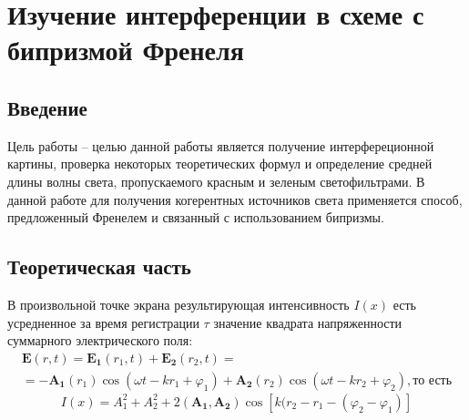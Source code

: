 
\usepackage{setspace}
\usepackage{colortbl}
\usepackage{lscape}
\usepackage{booktabs,array}

\def\labauthors{Понур К.А., Сарафанов Ф.Г., Сидоров Д.А.}
\def\labgroup{$20.49^2$}
\def\labnumber{$14.7309^2$}
\def\labtheme{Изучение интерференции в схеме с бипризмой Френеля}
\renewcommand{\vec}{\mathbf}
\renewcommand{\Re}{\operatorname{Re}}
\renewcommand{\Im}{\operatorname{Im}}
\renewcommand{\phi}{\phi}
\renewcommand{\kappa}{\varkappa}
\renewcommand{\hat}{\widehat}
\renewcommand{\epsilon}{\varepsilon}
\renewcommand{\phi}{\varphi}



\begin{spacing}{1}
\tableofcontents
\end{spacing}
\newpage


 \section{Изучение интерференции в схеме с бипризмой Френеля}
\subsection{Введение}

Цель работы -- целью данной работы является получение интерфереционной картины, проверка некоторых теоретических формул
и определение средней длины волны света, пропускаемого красным и зеленым светофильтрами.
В данной работе для получения когерентных источников света применяется способ, предложенный Френелем и связанный с использованием бипризмы.
\subsection{Теоретическая часть}
В произвольной точке экрана результирующая интенсивность $I(x)$ есть усредненное за время регистрации $\tau$ значение квадрата напряженности суммарного электрического поля:
\begin{gather}
\label{eq:1}
	\vec{E}(r,t)=\vec{E_1}(r_1,t)+\vec{E_2}(r_2,t)=\\=
	-\vec{A_1}(r_1)\cos(\omega t-kr_1+\phi_1)+\vec{A_2}(r_2)
		\cos(\omega t -kr_2+\phi_2), \text{то есть} \nonumber
\end{gather}
\begin{equation}
	I(x)=A_1^2+A_2^2+2(\vec{A_1},\vec{A_2})\cos[k(r_2-r_1-(\phi_2-\phi_1)]
\end{equation}

